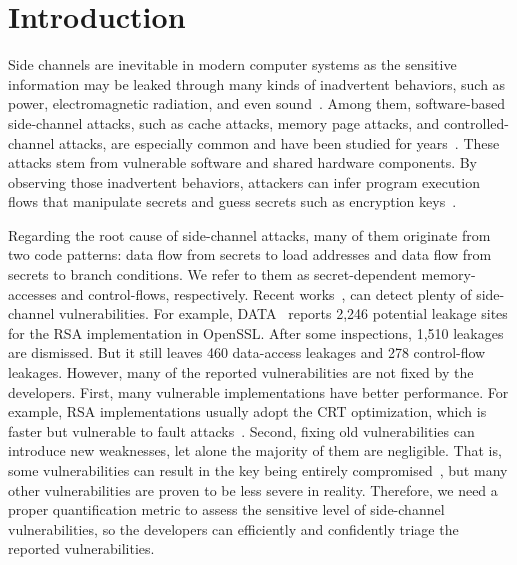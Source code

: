 \section{Introduction} 
Side channels are inevitable in modern computer systems as the sensitive
information may be leaked through many kinds of inadvertent behaviors, such as power,
electromagnetic radiation, and even
sound~\cite{agrawal2002side,kar20178,chari1999towards,217605,genkin2014rsa}.
Among them, software-based side-channel attacks, such as cache attacks, memory page
attacks, and controlled-channel attacks, are especially common and have been
studied for
years~\cite{7163052,217543,217589,lee2017inferring,191010,liu2015last}. These
attacks stem from vulnerable software and shared hardware components.
By observing those inadvertent behaviors, attackers can infer program
execution flows that manipulate secrets and guess secrets such as encryption
keys~\cite{Osvik2006,Gullasch:2011:CGB:2006077.2006784,203878,10.1007/978-3-540-45238-6_6}.


Regarding the root cause of side-channel attacks, many of them originate
from two code patterns: data flow from secrets to load
addresses and data flow from secrets to branch conditions. We refer to them as
secret-dependent memory-accesses and control-flows, respectively. 
Recent works~\cite{203878,217537,Wichelmann:2018:MFF:3274694.3274741,Brotzman19Casym,236338,182946},
can detect plenty of side-channel vulnerabilities. For example,
DATA~\cite{217537} reports 2,246 potential leakage sites for the RSA
implementation in OpenSSL\@. 
After some inspections, 1,510 leakages are dismissed. But it
still leaves 460 data-access leakages and 278 control-flow leakages. 
However, many of the reported vulnerabilities are not fixed by the developers.
First, many vulnerable implementations have better performance. For example,
RSA implementations usually adopt the CRT optimization,
which is faster but vulnerable to fault attacks~\cite{aumuller2002fault}.
Second, fixing old vulnerabilities can introduce new 
weaknesses, let alone the majority of them are negligible. 
That is, some vulnerabilities can result in the key being 
entirely compromised~\cite{184415, aumuller2002fault}, 
but many other vulnerabilities are proven to be less
severe in reality. Therefore, we need a proper quantification metric to 
assess the sensitive level of side-channel vulnerabilities,
so the developers can efficiently and confidently triage the reported vulnerabilities.


